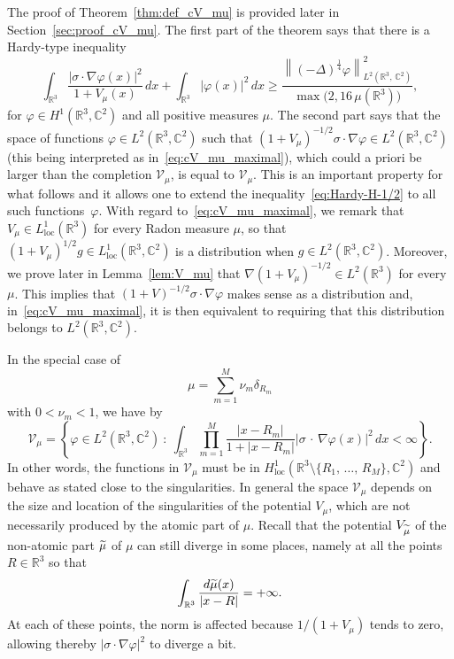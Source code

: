 \documentclass[AHL,Unicode,published]{cedram}
\newcommand{\R}{\mathbb{R}}
\newcommand{\C}{\mathbb{C}}
\newcommand{\cV}{\mathcal{V}}
\DeclareMathOperator{\loc}{loc}
\newcommand\1{{\ensuremath {\mathds 1} }}
\renewcommand\phi{\varphi}
\newcommand{\ii}{\infty}
\newcommand{\norm}[1]{ \left\| #1 \right\|}
\renewcommand{\geq}{\geqslant}
\renewcommand{\tilde}{\widetilde}
\let\oldtilde\tilde
\renewcommand*{\tilde}[1]{\mathchoice{\widetilde{#1}}{\widetilde{#1}}{\oldtilde{#1}}{\oldtilde{#1}}}
\begin{document}
The proof of Theorem~\ref{thm:def_cV_mu} is provided later in Section~\ref{sec:proof_cV_mu}. The first part of the theorem says that there is a Hardy-type inequality
\begin{equation}\label{eq:Hardy-H-1/2}
\int_{\R^3}\frac{\left|\sigma\cdot \nabla\phi(x)\right|^2}{1+V_\mu(x)}\,dx+\int_{\R^3}|\phi(x)|^2\,dx\geq \frac{\norm{(-\Delta)^{\frac14}\phi}^2_{L^2\left(\R^3,\,\C^2\right)}}{\max\big(2,16\,\mu\left(\R^3\right)\big)},
\end{equation}
for $\phi\in H^1(\R^3,\C^2)$ and all positive measures $\mu$. The second part says that the space of functions $\phi\in L^2(\R^3,\C^2)$ such that $(1+V_\mu)^{-1/2}\sigma\cdot\nabla\phi\in L^2(\R^3,\C^2)$ (this being interpreted as in~\eqref{eq:cV_mu_maximal}), which could a priori be larger than the completion $\cV_\mu$, is equal to $\cV_\mu$. This is an important property for what follows and it allows one to extend the inequality~\eqref{eq:Hardy-H-1/2} to all such functions~$\phi$. With regard to~\eqref{eq:cV_mu_maximal}, we remark that $V_\mu\in L^1_{\loc}(\R^3)$ for every Radon measure $\mu$, so that $(1+V_\mu)^{1/2}g\in L^1_{\loc}(\R^3,\C^2)$ is a distribution when $g\in L^2(\R^3,\C^2)$. Moreover, we prove later in Lemma~\ref{lem:V_mu} that $\nabla (1+V_\mu)^{-1/2}\in L^2(\R^3)$ for every $\mu$. This implies that $(1+V)^{-1/2}\sigma\cdot\nabla\phi$ makes sense as a distribution and, in~\eqref{eq:cV_mu_maximal}, it is then equivalent to requiring that this distribution belongs to $L^2(\R^3,\C^2)$.

\goodbreak
In the special case of
\[
\mu=\sum_{m=1}^M\nu_m\delta_{R_m}
\]
with $0< \nu_m<1$, we have by~\cite{EstLewSer-19}
\[
\cV_\mu=\left\{\phi \in L^2\left(\R^3,\C^2\right)\ :\ \int_{\R^3}\prod_{m=1}^M\frac{|x-R_m|}{1+|x-R_m|}\left|\sigma\,\cdot\,\nabla \phi(x)\right|^2\,dx<\ii\right\}.
\]
In other words, the functions in $\cV_\mu$ must be in $H^1_{\loc}(\R^3\setminus\{R_1,\,\dots,\,R_M\},\C^2)$ and behave as stated close to the singularities. In general the space $\cV_\mu$ depends on the size and location of the singularities of the potential $V_\mu$, which are not necessarily produced by the atomic part of $\mu$. Recall that the potential $V_{\tilde\mu}$ of the non-atomic part $\tilde\mu$ of $\mu$ can still diverge in some places, namely at all the points $R\in\R^3$ so that
\[
\int_{\R^3}\frac{d\tilde\mu(x)}{|x-R|}=+\ii.
\]
At each of these points, the norm is affected because $1/(1+V_\mu)$ tends to zero, allowing thereby $|\sigma\cdot\nabla\phi|^2$ to diverge a bit.
\end{document}
